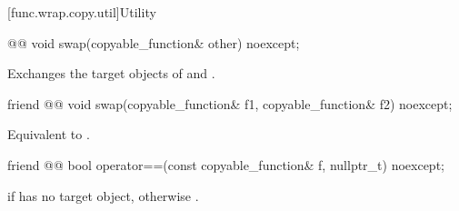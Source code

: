 [func.wrap.copy.util]{Utility}

%
\begin{itemdecl}
@@ void swap(copyable_function& other) noexcept;
\end{itemdecl}

\begin{itemdescr}
\pnum
\effects
Exchanges the target objects of  and .
\end{itemdescr}

%
\begin{itemdecl}
friend @@ void swap(copyable_function& f1, copyable_function& f2) noexcept;
\end{itemdecl}

\begin{itemdescr}
\pnum
\effects
Equivalent to .
\end{itemdescr}

%
\begin{itemdecl}
friend @@ bool operator==(const copyable_function& f, nullptr_t) noexcept;
\end{itemdecl}

\begin{itemdescr}
\pnum
\returns
{} if  has no target object, otherwise .
\end{itemdescr}
